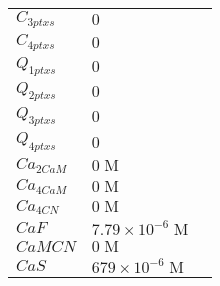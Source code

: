 \documentclass[a4paper,10.0pt]{article}
\begin{document}
{\begin{longtabu}{| l l l |}
  $C_{3 ptxs}$\hspace{0.5cm} & $0$\hspace{0.5cm} & \hspace{0.5cm}\\
  $C_{4 ptxs}$\hspace{0.5cm} & $0$\hspace{0.5cm} & \hspace{0.5cm}\\
  $Q_{1 ptxs}$\hspace{0.5cm} & $0$\hspace{0.5cm} & \hspace{0.5cm}\\
  $Q_{2 ptxs}$\hspace{0.5cm} & $0$\hspace{0.5cm} & \hspace{0.5cm}\\
  $Q_{3 ptxs}$\hspace{0.5cm} & $0$\hspace{0.5cm} & \hspace{0.5cm}\\
  $Q_{4 ptxs}$\hspace{0.5cm} & $0$\hspace{0.5cm} & \hspace{0.5cm}\\
  $Ca_{2 CaM}$\hspace{0.5cm} & $0\;\mathrm{M}$\hspace{0.5cm} & \hspace{0.5cm}\\
  $Ca_{4 CaM}$\hspace{0.5cm} & $0\;\mathrm{M}$\hspace{0.5cm} & \hspace{0.5cm}\\
  $Ca_{4 CN}$\hspace{0.5cm} & $0\;\mathrm{M}$\hspace{0.5cm} & \hspace{0.5cm}\\
  $CaF$\hspace{0.5cm} & $7.79\!\times\!10 ^{-6}\;\mathrm{M}$\hspace{0.5cm} & \hspace{0.5cm}\\
  $CaMCN$\hspace{0.5cm} & $0\;\mathrm{M}$\hspace{0.5cm} & \hspace{0.5cm}\\
  $CaS$\hspace{0.5cm} & $679\!\times\!10 ^{-6}\;\mathrm{M}$\hspace{0.5cm} & \hspace{0.5cm}\\

\end{longtabu}}
\end{document}
